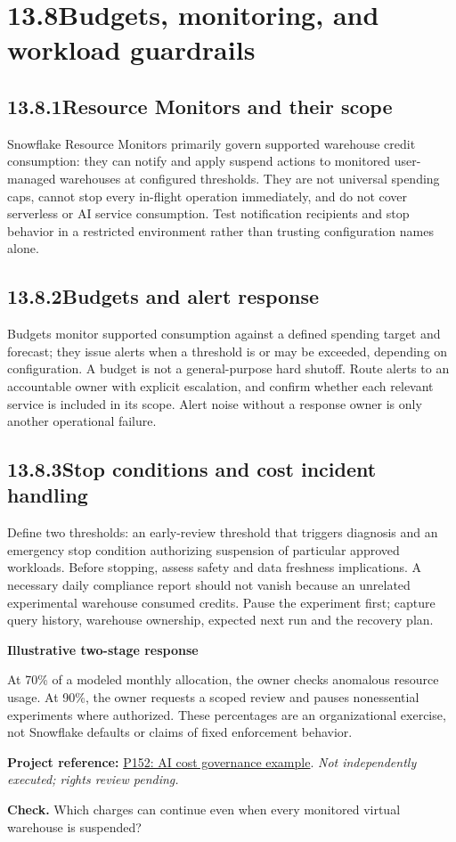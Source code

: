 \documentclass[11pt,twoside]{article}
\newcommand{\topic}[2]{\subsection*{#1\quad #2}}
\newcommand{\repo}[2]{\par\begingroup\fontsize{8.0}{9.6}\selectfont\sffamily\color{inkgray}\textbf{Project reference:} \href{#2}{#1}. \textit{Not independently executed; rights review pending.}\par\endgroup}
\begin{document}
\section*{13.8\quad Budgets, monitoring, and workload guardrails}
\topic{13.8.1}{Resource Monitors and their scope}
Snowflake Resource Monitors primarily govern supported warehouse credit consumption: they can notify and apply suspend actions to monitored user-managed warehouses at configured thresholds. They are not universal spending caps, cannot stop every in-flight operation immediately, and do not cover serverless or AI service consumption. Test notification recipients and stop behavior in a restricted environment rather than trusting configuration names alone.
\topic{13.8.2}{Budgets and alert response}
Budgets monitor supported consumption against a defined spending target and forecast; they issue alerts when a threshold is or may be exceeded, depending on configuration. A budget is not a general-purpose hard shutoff. Route alerts to an accountable owner with explicit escalation, and confirm whether each relevant service is included in its scope. Alert noise without a response owner is only another operational failure.
\topic{13.8.3}{Stop conditions and cost incident handling}
Define two thresholds: an early-review threshold that triggers diagnosis and an emergency stop condition authorizing suspension of particular approved workloads. Before stopping, assess safety and data freshness implications. A necessary daily compliance report should not vanish because an unrelated experimental warehouse consumed credits. Pause the experiment first; capture query history, warehouse ownership, expected next run and the recovery plan.
\begin{whitebox}\textbf{Illustrative two-stage response}\par
At 70\% of a modeled monthly allocation, the owner checks anomalous resource usage. At 90\%, the owner requests a scoped review and pauses nonessential experiments where authorized. These percentages are an organizational exercise, not Snowflake defaults or claims of fixed enforcement behavior.
\end{whitebox}
\repo{P152: AI cost governance example}{https://github.com/sfc-gh-sochandra/ai-cost-governance}
\textbf{Check.} Which charges can continue even when every monitored virtual warehouse is suspended?
\newpage
\end{document}
